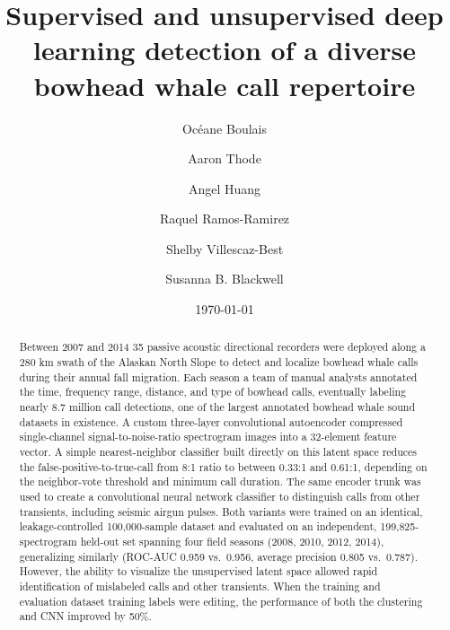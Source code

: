\documentclass[preprint,NumberedRefs]{JASAnew}
\begin{document}
\title[JASA Article]{Supervised and unsupervised deep learning detection of a diverse bowhead whale call repertoire}
\author{Océane Boulais}


\author{Aaron Thode}


\author{Angel Huang}

\author{Raquel Ramos-Ramirez}

\author{Shelby Villescaz-Best}

\author{Susanna B. Blackwell}


\date{\today} 

\begin{abstract}

Between 2007 and 2014 35 passive acoustic directional recorders were deployed along a 280 km swath of the Alaskan North Slope to detect and localize bowhead whale calls during their annual fall migration. Each season a team of manual analysts annotated the time, frequency range, distance, and type of bowhead calls, eventually labeling nearly 8.7 million call detections, one of the largest annotated bowhead whale sound datasets in existence.   A custom three-layer convolutional autoencoder compressed single-channel signal-to-noise-ratio spectrogram images into a 32-element feature vector. A simple nearest-neighbor classifier built directly on this latent space reduces the false-positive-to-true-call from 8:1 ratio to between 0.33:1 and 0.61:1, depending on the neighbor-vote threshold and minimum call duration. The same encoder trunk was used to create a convolutional neural network  classifier to distinguish calls from other transients, including seismic airgun pulses. Both variants were trained on an identical, leakage-controlled 100,000-sample dataset and evaluated on an independent, 199,825-spectrogram held-out set spanning four field seasons (2008, 2010, 2012, 2014), generalizing similarly (ROC-AUC 0.959 vs.\ 0.956, average precision 0.805 vs.\ 0.787). However, the ability to visualize the unsupervised latent space allowed rapid identification of mislabeled calls and other transients.  When the training and evaluation dataset training labels were editing, the performance of both the clustering and CNN improved by 50\%.
\end{abstract}
\end{document}
